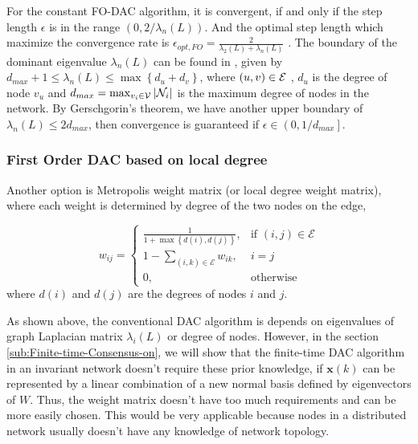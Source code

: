For the constant FO-DAC algorithm, it is convergent, if and only if
the step length $\epsilon$ is in the range $\left(0,2/\lambda_{n}\left(L\right)\right)$.
And the optimal step length which maximize the convergence rate is
$\epsilon{}_{opt,FO}=\frac{2}{\lambda_{2}\left(L\right)+\lambda_{n}\left(L\right)}$
\cite{Xiao2004}. The boundary of the dominant eigenvalue $\lambda_{n}\left(L\right)$
can be found in \cite{Russell1994}, given by $d_{max}+1\leq\lambda_{n}\left(L\right)\leq\max\left\{ d_{u}+d_{v}\right\} $,
where $\left(u,v\right)\in{\cal E}$ , $d_{u}$ is the degree of node
$v_{u}$ and $d_{max}=\max_{v_{i}\in{\cal V}}\left|{\cal N}_{i}\right|$
is the maximum degree of nodes in the network. By Gerschgorin's theorem,
we have another upper boundary of $\lambda_{n}\left(L\right)\leq2d_{max}$,
then convergence is guaranteed if $\epsilon\in\left(0,1/d_{max}\right]$. 


\subsubsection{First Order DAC based on local degree}

Another option is Metropolis weight matrix (or local degree weight
matrix), where each weight is determined by degree of the two nodes
on the edge,

\begin{equation}
w_{ij}=\begin{cases}
\frac{1}{1+\max\left\{ d(i),d(j)\right\} }, & \mbox{if }(i,j)\in\mathit{\mathcal{E}}\\
1-\sum_{(i,k)\in\mathit{\mathcal{E}}}w_{ik}, & i=j\\
0, & \mbox{otherwise}
\end{cases}
\end{equation}
where $d(i)$ and $d(j)$ are the degrees of nodes $i$ and $j$. 

As shown above, the conventional DAC algorithm is depends on eigenvalues
of graph Laplacian matrix $\lambda_{i}\left(L\right)$ or degree of
nodes. However, in the section \ref{sub:Finite-time-Consensus-on},
we will show that the finite-time DAC algorithm in an invariant network
doesn't require these prior knowledge, if $\mathbf{x}\left(k\right)$
can be represented by a linear combination of a new normal basis defined
by eigenvectors of $W$. Thus, the weight matrix doesn't have too
much requirements and can be more easily chosen. This would be very
applicable because nodes in a distributed network usually doesn't
have any knowledge of network topology. 


